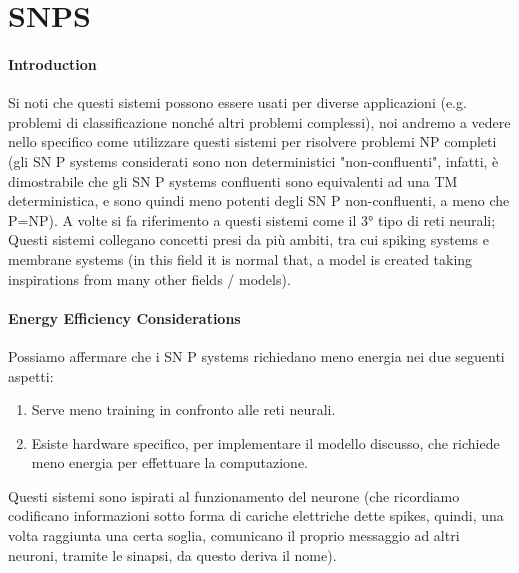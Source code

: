 \documentclass[12pt,a4paper]{report}
\begin{document}
\pagebreak
\section{SNPS}

\paragraph{Introduction}
Si noti che questi sistemi possono essere usati per diverse applicazioni (e.g. problemi di classificazione nonché altri problemi complessi), noi andremo a vedere nello specifico come utilizzare questi sistemi per risolvere problemi NP completi (gli SN P systems considerati sono non deterministici "non-confluenti", infatti, è dimostrabile che gli SN P systems confluenti sono equivalenti ad una TM deterministica, e sono quindi meno potenti degli SN P non-confluenti, a meno che P=NP). A volte si fa riferimento a questi sistemi come il 3° tipo di reti neurali; Questi sistemi collegano concetti presi da più ambiti, tra cui  spiking systems e membrane systems (in this field it is normal that, a model is created taking inspirations from many other fields / models).

\paragraph{Energy Efficiency Considerations}
Possiamo affermare che i SN P systems richiedano meno energia nei due seguenti aspetti:
\begin{enumerate}
\item Serve meno training in confronto alle reti neurali.
\item Esiste hardware specifico, per implementare il modello discusso, che richiede meno energia per effettuare la computazione.
\end{enumerate}
Questi sistemi sono ispirati al funzionamento del neurone (che ricordiamo codificano informazioni sotto forma di cariche elettriche dette spikes, quindi, una volta raggiunta una certa soglia, comunicano il proprio messaggio ad altri neuroni, tramite le sinapsi, da questo deriva il nome).
\end{document}
